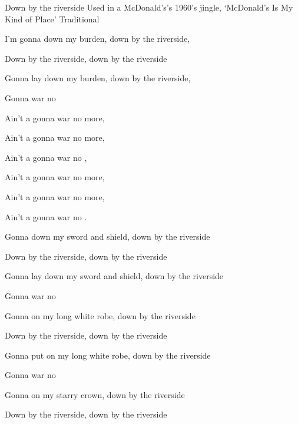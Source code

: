 \begin{SBSong}{Down by the riverside}
  {Used in a McDonald's's 1960's jingle, `McDonald's Is My Kind of Place'}
  {Traditional}
  \begin{SBVerse}
    I'm gonna  down my burden, down by the riverside,
    
    Down by the riverside, down by the riverside

    Gonna lay down my burden, down by the riverside,

    Gonna  war no 
  \end{SBVerse}
  \begin{SBChorus}
    Ain't a gonna  war no more, 

    Ain't a gonna  war no more,

    Ain't a gonna  war no , 

    Ain't a gonna  war no more,

    Ain't a gonna  war no more, 

    Ain't a gonna  war no .  
  \end{SBChorus}
  \begin{SBVerse}
    Gonna  down my sword and shield,  down by the riverside

    Down by the riverside, down by the riverside

    Gonna lay down my sword and shield, down by the riverside

    Gonna  war no  
  \end{SBVerse}
  \begin{SBVerse}
    Gonna  on my long white robe, down by the riverside

    Down by the riverside, down by the riverside

    Gonna put on my long white robe, down by the riverside

    Gonna  war no  
  \end{SBVerse}
  \begin{SBVerse}
    Gonna  on my starry crown, down by the riverside

    Down by the riverside, down by the riverside
    

\end{SBVerse}
\end{SBSong}
